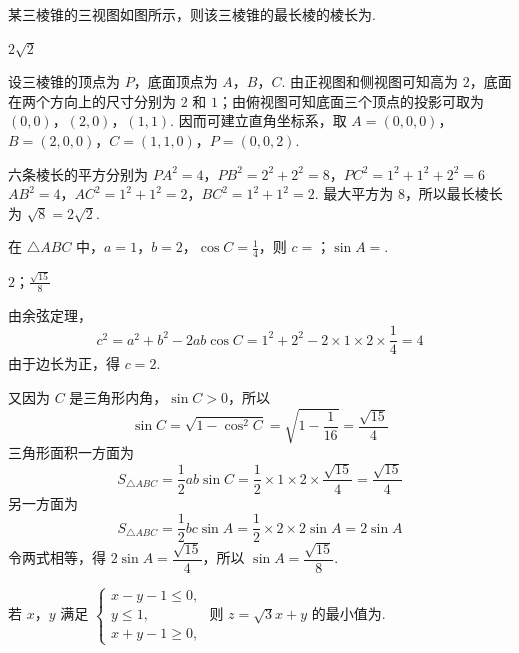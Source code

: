 \begin{problem}
某三棱锥的三视图如图所示，则该三棱锥的最长棱的棱长为\fillinblank{}.

\end{problem}

\begin{answer}
\(2\sqrt{2}\)
\end{answer}

\begin{solution}
设三棱锥的顶点为 \(P\)，底面顶点为 \(A\)，\(B\)，\(C\). 由正视图和侧视图可知高为 \(2\)，底面在两个方向上的尺寸分别为 \(2\) 和 \(1\)；由俯视图可知底面三个顶点的投影可取为 \((0,0)\)，\((2,0)\)，\((1,1)\). 因而可建立直角坐标系，取
\(A=(0,0,0)\)，\(B=(2,0,0)\)，\(C=(1,1,0)\)，\(P=(0,0,2)\).

六条棱长的平方分别为
\(PA^2=4\)，\(PB^2=2^2+2^2=8\)，\(PC^2=1^2+1^2+2^2=6\)
\(AB^2=4\)，\(AC^2=1^2+1^2=2\)，\(BC^2=1^2+1^2=2\).
最大平方为 \(8\)，所以最长棱长为 \(\sqrt8=2\sqrt2\).
\end{solution}

\begin{problem}
在 \(\triangle ABC\) 中，\(a = 1\)，\(b = 2\)，\(\cos C = \frac{1}{4}\)，则 \(c =\)\fillinblank{}；\(\sin A =\)\fillinblank{}.
\end{problem}

\begin{answer}
\(2\)；\(\frac{\sqrt{15}}{8}\)
\end{answer}

\begin{solution}
由余弦定理，
\[
c^2=a^2+b^2-2ab\cos C=1^2+2^2-2\times1\times2\times\frac14=4
\]
由于边长为正，得 \(c=2\).

又因为 \(C\) 是三角形内角，\(\sin C>0\)，所以
\[
\sin C=\sqrt{1-\cos^2C}=\sqrt{1-\frac1{16}}=\frac{\sqrt{15}}4
\]
三角形面积一方面为
\[
S_{\triangle ABC}=\frac12ab\sin C=\frac12\times1\times2\times\frac{\sqrt{15}}4=\frac{\sqrt{15}}4
\]
另一方面为
\[
S_{\triangle ABC}=\frac12bc\sin A=\frac12\times2\times2\sin A=2\sin A
\]
令两式相等，得 \(2\sin A=\dfrac{\sqrt{15}}4\)，所以 \(\sin A=\dfrac{\sqrt{15}}8\).
\end{solution}

\begin{problem}
若 \(x\)，\(y\) 满足 \(\begin{cases}
x - y - 1 \leqslant 0,\\
y \leqslant 1,\\
x + y - 1 \geqslant 0,
\end{cases}\) 则 \(z = \sqrt{3} x + y\) 的最小值为\fillinblank{}.
\end{problem}

